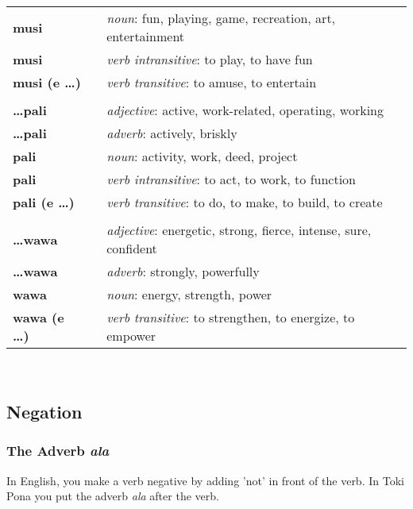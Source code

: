\begin{supertabular}{p{2,5cm}|ll}
\textbf{musi} && \textit{noun}: fun, playing, game, recreation, art, entertainment \\ %
\textbf{musi} && \textit{verb intransitive}: to play, to have fun \\ %
\textbf{musi (e \dots)} && \textit{verb transitive}: to amuse, to entertain \\ %
 && \\ %
%
\textbf{\dots pali} && \textit{adjective}: active, work-related, operating, working \\ %
\textbf{\dots pali} && \textit{adverb}: actively, briskly \\ %
\textbf{pali} && \textit{noun}: activity, work, deed, project \\ %
\textbf{pali} && \textit{verb intransitive}: to act, to work, to function \\ %
\textbf{pali (e \dots)} && \textit{verb transitive}: to do, to make, to build, to create \\ %
 && \\ %
%
\textbf{\dots wawa} && \textit{adjective}: energetic, strong, fierce, intense, sure, confident \\ %
\textbf{\dots wawa} && \textit{adverb}: strongly, powerfully \\ %
\textbf{wawa} && \textit{noun}: energy, strength, power \\ %
\textbf{wawa (e \dots)} && \textit{verb transitive}: to strengthen, to energize, to empower \\ %
\end{supertabular} \\
%
\newpage
%
\subsection*{Negation}
%
%
\subsubsection*{The Adverb \textit{ala}}
%
%
In English, you make a verb negative by adding 'not' in front of the verb.
In Toki Pona you put the adverb \textit{ala} after the verb. 


